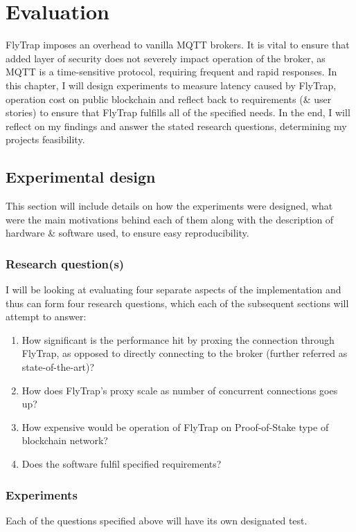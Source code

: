 \chapter{Evaluation}\label{chap:evaluation}
FlyTrap imposes an overhead to vanilla MQTT brokers. It is vital to ensure that added layer of security does not severely impact operation of the broker, as MQTT is a time-sensitive protocol, requiring frequent and rapid responses. In this chapter, I will design experiments to measure latency caused by FlyTrap, operation cost on public blockchain and reflect back to requirements (\& user stories) to ensure that FlyTrap fulfills all of the specified needs. In the end, I will reflect on my findings and answer the stated research questions, determining my projects feasibility.

\section{Experimental design}
This section will include details on how the experiments were designed, what were the main motivations behind each of them along with the description of hardware \& software used, to ensure easy reproducibility.
\subsection{Research question(s)}
I will be looking at evaluating four separate aspects of the implementation and thus can form four research questions, which each of the subsequent sections will attempt to answer:
\begin{enumerate}
  \item How significant is the performance hit by proxing the connection through FlyTrap, as opposed to directly connecting to the broker (further referred as state-of-the-art)?
  \item How does FlyTrap's proxy scale as number of concurrent connections goes up?
  \item How expensive would be operation of FlyTrap on Proof-of-Stake type of blockchain network?
  \item Does the software fulfil specified requirements?
\end{enumerate}
\subsection{Experiments}
Each of the questions specified above will have its own designated test.

